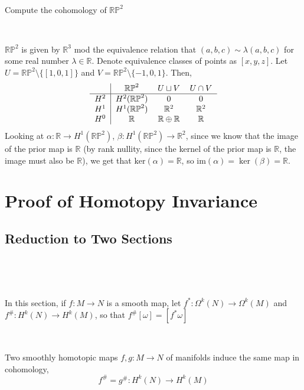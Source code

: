 \documentclass{article}
\begin{document}
\begin{exercise}[1]
\

Compute the cohomology of $\mathbb{RP}^2$
\end{exercise}

\begin{solution}
\

$\mathbb{RP}^2$ is given by $\mathbb{R}^3$ mod the equivalence relation that $(a,b,c) \sim \lambda(a,b,c)$ for some real number $\lambda \in \mathbb{R}$. Denote equivalence classes of points as $[x,y,z]$. Let $U = \mathbb{RP}^2 \setminus \{[1,0,1]\}$ and $V = \mathbb{RP}^2 \setminus \{-1, 0, 1\}$. Then, \[\begin{tabular}{c | c c c}
  & $\mathbb{RP}^2$ & $U \sqcup V$ & $U \cap V$\\
  \hline
  $H^2$ & $H^2(\mathbb{RP}^2)$ & $0$ & $0$\\
  $H^1$ & $H^1(\mathbb{RP}^2)$ & $ \mathbb{R}^2 $ & $\mathbb{R}^2$\\
  $H^0$ & $\mathbb{R}$ & $\mathbb{R} \oplus \mathbb{R}$ & $\mathbb{R}$
\end{tabular}\]Looking at $\alpha: \mathbb{R} \to H^1(\mathbb{RP}^2)$, $\beta: H^1(\mathbb{RP}^2) \to \mathbb{R}^2$, since we know that the image of the prior map is $\mathbb{R}$ (by rank nullity, since the kernel of the prior map is $\mathbb{R}$, the image must also be $\mathbb{R}$), we get that $\text{ker}(\alpha) = \mathbb{R}$, so $\text{im}(\alpha) = \ker(\beta) = \mathbb{R}$. 
\end{solution}


\section{Proof of Homotopy Invariance}

\subsection{Reduction to Two Sections}
\

\begin{remark}
\

In this section, if $f: M \to N$ is a smooth map, let $f^*: \Omega^k(N) \to \Omega^k(M)$ and $f^\#: H^k(N) \to H^k(M)$, so that $f^\#[\omega] = [f^*\omega]$
\end{remark}

\begin{theorem}
\

Two smoothly homotopic maps $f,g : M \to N$ of manifolds induce the same map in cohomology, $$f^\# = g^\#: H^k(N) \to H^k(M)$$
\end{theorem}
\end{document}
